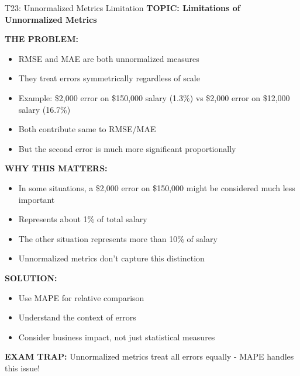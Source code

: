 \documentclass[8pt]{beamer}
\begin{document}
	\begin{frame}{T23: Unnormalized Metrics Limitation}
		\fontsize{6.5}{7.5}\selectfont
		\textbf{TOPIC: Limitations of Unnormalized Metrics}
		
		\vspace{0.1cm}
		\textbf{THE PROBLEM:}
		\begin{itemize}
			\item RMSE and MAE are both unnormalized measures
			\item They treat errors symmetrically regardless of scale
			\item Example: \$2,000 error on \$150,000 salary (1.3\%) vs \$2,000 error on \$12,000 salary (16.7\%)
			\item Both contribute same to RMSE/MAE
			\item But the second error is much more significant proportionally
		\end{itemize}
		
		\vspace{0.1cm}
		\textbf{WHY THIS MATTERS:}
		\begin{itemize}
			\item In some situations, a \$2,000 error on \$150,000 might be considered much less important
			\item Represents about 1\% of total salary
			\item The other situation represents more than 10\% of salary
			\item Unnormalized metrics don't capture this distinction
		\end{itemize}
		
		\vspace{0.1cm}
		\textbf{SOLUTION:}
		\begin{itemize}
			\item Use MAPE for relative comparison
			\item Understand the context of errors
			\item Consider business impact, not just statistical measures
		\end{itemize}
		
		\textcolor{myred}{\textbf{EXAM TRAP:}} Unnormalized metrics treat \textcolor{myblue}{all errors equally} - MAPE handles this issue!
	\end{frame}
	
\end{document}
